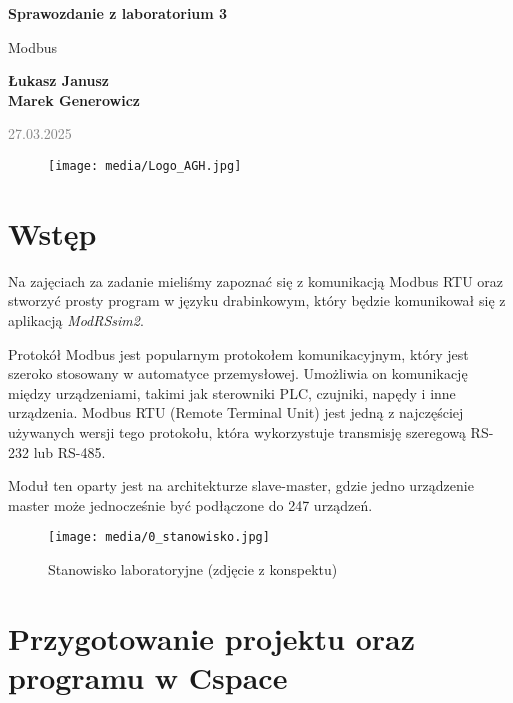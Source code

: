 \documentclass{article}
\begin{document}
\begin{titlepage}
    \begin{center}
        \vspace*{1cm}
            
        \Huge
        \textbf{Sprawozdanie z laboratorium 3}
            
        \vspace{0.5cm}
        \LARGE
        Modbus 
            
        \vspace{1.5cm}
            
        \textbf{Łukasz Janusz\\Marek Generowicz}

        \normalsize      
        \textcolor{gray}{27.03.2025}
        \vfill
        \begin{figure}[hb]
            \centering
            \texttt{[image: media/Logo\_AGH.jpg]}
        \end{figure}   
    \end{center}
\end{titlepage}

\section{Wstęp}
Na zajęciach za zadanie mieliśmy zapoznać się z komunikacją Modbus RTU oraz stworzyć prosty program w języku drabinkowym, który będzie komunikował się z aplikacją \textit{ModRSsim2}.

Protokół Modbus jest popularnym protokołem komunikacyjnym, który jest szeroko stosowany w automatyce przemysłowej. Umożliwia on komunikację między urządzeniami, takimi jak sterowniki PLC, czujniki, napędy i inne urządzenia. Modbus RTU (Remote Terminal Unit) jest jedną z najczęściej używanych wersji tego protokołu, która wykorzystuje transmisję szeregową RS-232 lub RS-485.

Moduł ten oparty jest na architekturze slave-master, gdzie jedno urządzenie master może jednocześnie być podłączone do 247 urządzeń.

\begin{figure}[H]
    \centering
    \texttt{[image: media/0\_stanowisko.jpg]}
    \caption{Stanowisko laboratoryjne (zdjęcie z konspektu)}
    \label{fig:stanowisko}
\end{figure}


\newpage
\section{Przygotowanie projektu oraz programu w Cspace}
\end{document}
